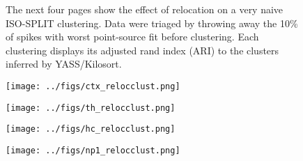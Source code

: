 \documentclass[
  12pt,
]{article}
\theoremstyle{plain}
\theoremstyle{definition}
\theoremstyle{remark}
\newcommand{\1}[1]{\mathbb{1}_{{#1}}}
\begin{document}
\FloatBarrier
\pagebreak

\begin{figure}[H]
\caption{The next four pages show the effect of relocation on a very naive ISO-SPLIT clustering. Data were triaged by throwing away the 10\% of spikes with worst point-source fit before clustering. Each clustering displays its adjusted rand index (ARI) to the clusters inferred by YASS/Kilosort.}
\label{fig:isosplit}
\end{figure}

\begin{figure}[hbtp]
\vspace{-0.75in}
\begin{adjustwidth*}{-2in}{-2in}\begin{center}
\texttt{[image: ../figs/ctx\_relocclust.png]}
\end{center}\end{adjustwidth*}
\end{figure}
\begin{figure}[hbtp]
\vspace{-0.75in}
\begin{adjustwidth*}{-2in}{-2in}\begin{center}
\texttt{[image: ../figs/th\_relocclust.png]}
\end{center}\end{adjustwidth*}
\end{figure}
\begin{figure}[hbtp]
\vspace{-0.75in}
\begin{adjustwidth*}{-2in}{-2in}\begin{center}
\texttt{[image: ../figs/hc\_relocclust.png]}
\end{center}\end{adjustwidth*}
\end{figure}
\begin{figure}[hbtp]
\vspace{-0.75in}
\begin{adjustwidth*}{-2in}{-2in}\begin{center}
\texttt{[image: ../figs/np1\_relocclust.png]}
\end{center}\end{adjustwidth*}
\end{figure}
\end{document}
